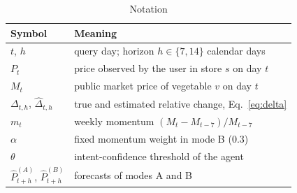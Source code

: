 \begin{table}[t]
\caption{Notation}
\label{tab:notation}
\centering
\footnotesize
\begin{tabular}{@{}ll@{}}
\toprule
Symbol & Meaning \\
\midrule
$t$, $h$ & query day; horizon $h\in\{7,14\}$ calendar days \\
$P_t$ & price observed by the user in store $s$ on day $t$ \\
$M_t$ & public market price of vegetable $v$ on day $t$ \\
$\Delta_{t,h}$, $\hat{\Delta}_{t,h}$ & true and estimated relative change, Eq.~\eqref{eq:delta} \\
$m_t$ & weekly momentum $(M_t-M_{t-7})/M_{t-7}$ \\
$\alpha$ & fixed momentum weight in mode B ($0.3$) \\
$\theta$ & intent-confidence threshold of the agent \\
$\hat{P}^{(A)}_{t+h}$, $\hat{P}^{(B)}_{t+h}$ & forecasts of modes A and B \\
\bottomrule
\end{tabular}
\end{table}
